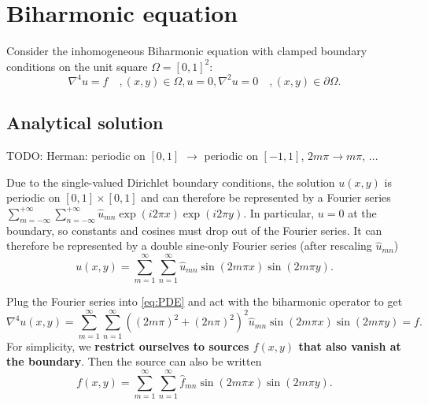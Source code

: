 \section{Biharmonic equation}
\label{sec:PDE}

\newtheorem{theorem}{Theorem}
\newtheorem{lemma}{Lemma}

Consider the inhomogeneous Biharmonic equation with clamped boundary conditions on the unit square $\Omega = [0, 1]^2$:
\begin{subequations}\label{eq:PDE}
  \begin{equation}
    \nabla^4 u = f \quad, (x, y) \in \Omega,
  \end{equation}
  \begin{equation}
    u = 0, \nabla^2u = 0 \quad, (x, y) \in \partial\Omega.
  \end{equation}
\end{subequations}

\subsection{Analytical solution}

TODO: Herman: periodic on $[0,1]$ $\rightarrow$ periodic on $[-1,1]$, $2m\pi \rightarrow m\pi$, ...

Due to the single-valued Dirichlet boundary conditions, the solution $u(x,y)$ is periodic on $[0,1]\times[0,1]$ and can therefore be represented by a Fourier series $\sum_{m=-\infty}^{+\infty} \sum_{n=-\infty}^{+\infty} \hat{u}_{mn} \exp(i 2 \pi x) \exp(i 2 \pi y)$.
In particular, $u = 0$ at the boundary, so constants and cosines must drop out of the Fourier series.
It can therefore be represented by a double sine-only Fourier series (after rescaling $\hat{u}_{mn}$)
\newcommand{\fourierseries}[3]{
	\sum_{#2=1}^{\infty} \sum_{#3=1}^{\infty} #1 \sin(2 #2 \pi x) \sin(2 #2 \pi y)
}
\newcommand{\fourierexpand}[1]{
	\fourierseries{\hat{#1}_{mn}}{m}{n}
}
\begin{equation}
u(x,y) = \fourierexpand{u}.
\label{pde:equation:fourierexpansion}
\end{equation}

Plug the Fourier series into \cref{eq:PDE} and act with the biharmonic operator to get
\begin{equation*}
\nabla^4 u(x,y) = \fourierseries{((2m\pi)^2+(2n\pi)^2)^2 \hat{u}_{mn}}{m}{n} = f.
\end{equation*}
For simplicity, we \textbf{restrict ourselves to sources $f(x,y)$ that also vanish at the boundary}.
Then the source can also be written
\begin{equation}
	f(x,y) = \fourierexpand{f}.
\end{equation}

